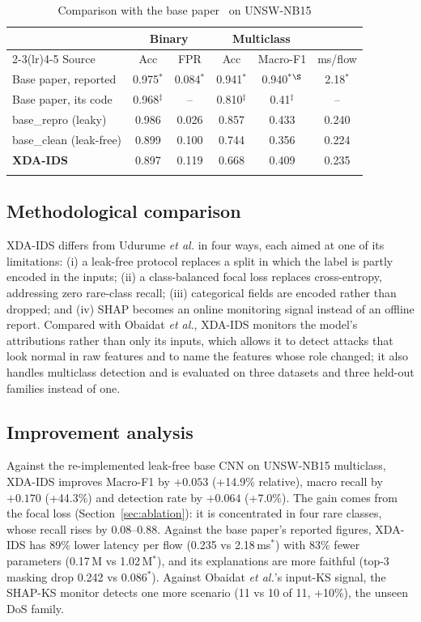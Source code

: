 \documentclass[pdflatex,sn-mathphys-num]{sn-jnl}%
\newcommand{\paperval}{$^{*}$}%
\begin{document}
\begin{table}[!htbp]
\caption{Comparison with the base paper~\cite{udurume2026} on UNSW-NB15}\label{tab:quant}%
\begin{tabular}{@{}lccccc@{}}
\toprule
& \multicolumn{2}{c}{Binary} & \multicolumn{2}{c}{Multiclass} & \\
\cmidrule(lr){2-3}\cmidrule(lr){4-5}
Source & Acc & FPR & Acc & Macro-F1 & ms/flow \\
\midrule
Base paper, reported & 0.975\paperval & 0.084\paperval & 0.941\paperval & 0.940\paperval$^{\S}$ & 2.18\paperval \\
Base paper, its code & 0.968$^{\ddagger}$ & -- & 0.810$^{\ddagger}$ & 0.41$^{\ddagger}$ & -- \\
base\_repro (leaky) & 0.986 & 0.026 & 0.857 & 0.433 & 0.240 \\
base\_clean (leak-free) & 0.899 & 0.100 & 0.744 & 0.356 & 0.224 \\
\textbf{XDA-IDS} & 0.897 & 0.119 & 0.668 & 0.409 & 0.235 \\
\botrule
\end{tabular}
\end{table}

\subsection{Methodological comparison}
XDA-IDS differs from Udurume \textit{et al.} in four ways, each aimed at one of its limitations: (i) a leak-free protocol replaces a split in which the label is partly encoded in the inputs; (ii) a class-balanced focal loss replaces cross-entropy, addressing zero rare-class recall; (iii) categorical fields are encoded rather than dropped; and (iv) SHAP becomes an online monitoring signal instead of an offline report. Compared with Obaidat \textit{et al.}, XDA-IDS monitors the model's attributions rather than only its inputs, which allows it to detect attacks that look normal in raw features and to name the features whose role changed; it also handles multiclass detection and is evaluated on three datasets and three held-out families instead of one.

\subsection{Improvement analysis}
Against the re-implemented leak-free base CNN on UNSW-NB15 multiclass, XDA-IDS improves Macro-F1 by $+0.053$ (+14.9\% relative), macro recall by $+0.170$ (+44.3\%) and detection rate by $+0.064$ (+7.0\%). The gain comes from the focal loss (Section~\ref{sec:ablation}): it is concentrated in four rare classes, whose recall rises by 0.08--0.88. Against the base paper's reported figures, XDA-IDS has 89\% lower latency per flow (0.235 vs 2.18\,ms$^{*}$) with 83\% fewer parameters (0.17\,M vs 1.02\,M$^{*}$), and its explanations are more faithful (top-3 masking drop 0.242 vs 0.086$^{*}$). Against Obaidat \textit{et al.}'s input-KS signal, the SHAP-KS monitor detects one more scenario (11 vs 10 of 11, +10\%), the unseen DoS family.
\end{document}
